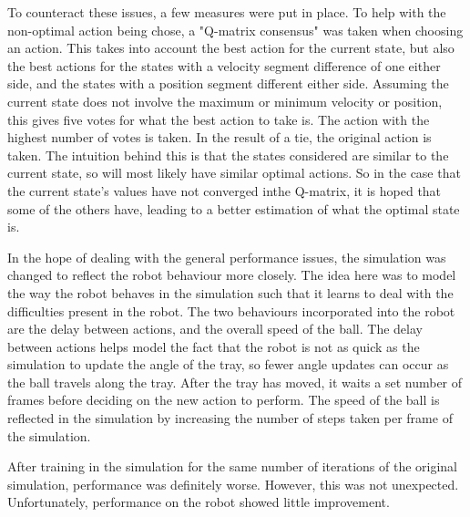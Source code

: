 \documentclass[12pt,a4paper]{article}
\begin{document}
To counteract these issues, a few measures were put in place. To help with the  non-optimal action being chose, a "Q-matrix consensus" was taken when choosing an action. This takes into account the best action for the current state, but also the best actions for the states with a velocity segment difference of one either side, and the states with a position segment different either side. Assuming the current state does not involve the maximum or minimum velocity or position, this gives five votes for what the best action to take is. The action with the highest number of votes is taken. In the result of a tie, the original action is taken. The intuition behind this is that the states considered are similar to the current state, so will most likely have similar optimal actions. So in the case that the current state's values have not converged inthe Q-matrix, it is hoped that some of the others have, leading to a better estimation of what the optimal state is. 

In the hope of dealing with the general performance issues, the simulation was changed to reflect the robot behaviour more closely. The idea here was to model the way the robot behaves in the simulation such that it learns to deal with the difficulties present in the robot. The two behaviours incorporated into the robot are the delay between actions, and the overall speed of the ball. The delay between actions helps model the fact that the robot is not as quick as the simulation to update the angle of the tray, so fewer angle updates can occur as the ball travels along the tray. After the tray has moved, it waits a set number of frames before deciding on the new action to perform. The speed of the ball is reflected in the simulation by increasing the number of steps taken per frame of the simulation. 

After training in the simulation for the same number of iterations of the original simulation, performance was definitely worse. However, this was not unexpected. Unfortunately, performance on the robot showed little improvement. 
\end{document}
